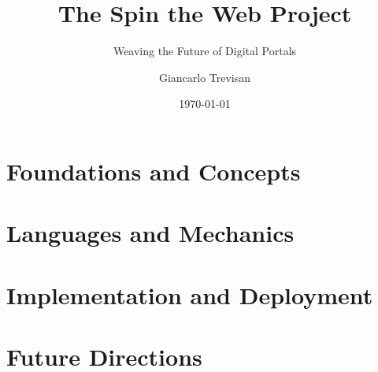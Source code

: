 \documentclass[11pt,openright,twoside,a4paper]{book}
\title{The Spin the Web Project}
\subtitle{Weaving the Future of Digital Portals}
\author{Giancarlo Trevisan}
\date{\today}
\begin{document}
\frontmatter




\tableofcontents

\mainmatter

\part{Foundations and Concepts}






\part{Languages and Mechanics}






\part{Implementation and Deployment}



\part{Future Directions}



\backmatter


\printindex
\end{document}
